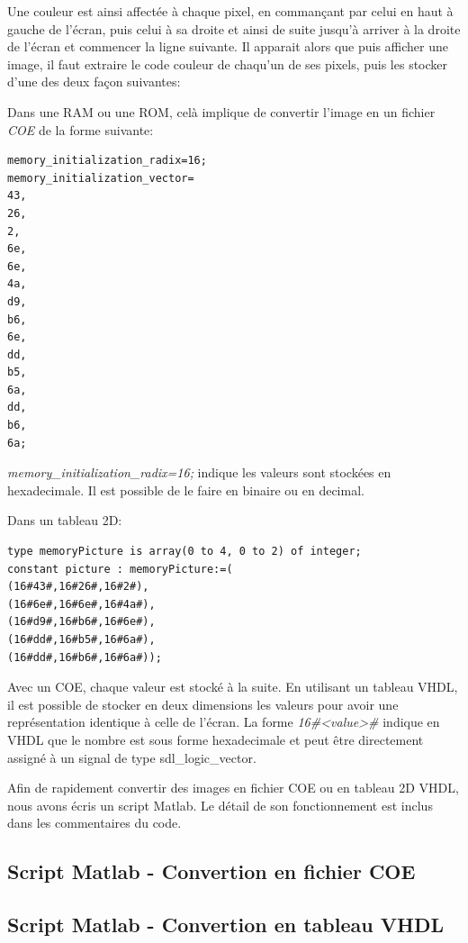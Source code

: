 \documentclass[french]{nakrule}
\begin{document}
Une couleur est ainsi affectée à chaque pixel, en commançant par celui en haut à
gauche de l'écran, puis celui à sa droite et ainsi de suite jusqu'à arriver à la
droite de l'écran et commencer la ligne suivante. Il apparait alors que puis
afficher une image, il faut extraire le code couleur de chaqu'un de ses pixels,
puis les stocker d'une des deux façon suivantes:\vspace{.1in}
\begin{items}
\item Dans une RAM ou une ROM, celà implique de convertir l'image en un fichier
  \emph{COE} de la forme suivante:
  \begin{lstlisting}[frame=single, basicstyle=\scriptsize, backgroundcolor=\color{backcolor}]
memory_initialization_radix=16;
memory_initialization_vector=
43,
26,
2,
6e,
6e,
4a,
d9,
b6,
6e,
dd,
b5,
6a,
dd,
b6,
6a;
\end{lstlisting}
\emph{memory\_initialization\_radix=16;} indique les valeurs sont stockées en
hexadecimale. Il est possible de le faire en binaire ou en decimal.
\item Dans un tableau 2D:
  \begin{lstlisting}[style=vhdl]
type memoryPicture is array(0 to 4, 0 to 2) of integer;
constant picture : memoryPicture:=(
(16#43#,16#26#,16#2#),
(16#6e#,16#6e#,16#4a#),
(16#d9#,16#b6#,16#6e#),
(16#dd#,16#b5#,16#6a#),
(16#dd#,16#b6#,16#6a#));
  \end{lstlisting}
\end{items}

Avec un COE, chaque valeur est stocké à la suite. En utilisant un tableau VHDL,
il est possible de stocker en deux dimensions les valeurs pour avoir une
représentation identique à celle de l'écran. La forme \emph{16\#<value>\#} indique
en VHDL que le nombre est sous forme hexadecimale et peut être directement
assigné à un signal de type sdl\_logic\_vector.

Afin de rapidement convertir des images en fichier COE ou en tableau 2D VHDL,
nous avons écris un script Matlab. Le détail de son fonctionnement est inclus
dans les commentaires du code.


\clearpage

\subsection{Script Matlab - Convertion en fichier COE}
\label{subsec:Script1}
\vspace{.1in}

\clearpage

\subsection{Script Matlab - Convertion en tableau VHDL}
\label{subsec:Script2}
\vspace{.1in}

\end{document}
